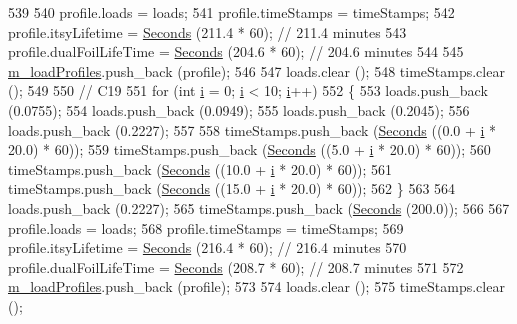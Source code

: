 \begin{DoxyCode}
539 
540   profile.loads = loads;
541   profile.timeStamps = timeStamps;
542   profile.itsyLifetime = \hyperlink{group__timecivil_ga33c34b816f8ff6628e33d5c8e9713b9e}{Seconds} (211.4 * 60);      \textcolor{comment}{// 211.4 minutes}
543   profile.dualFoilLifeTime = \hyperlink{group__timecivil_ga33c34b816f8ff6628e33d5c8e9713b9e}{Seconds} (204.6 * 60);  \textcolor{comment}{// 204.6 minutes}
544 
545   \hyperlink{classBatteryLifetimeTest_aee9ad324da18f58ee75689778580c3fb}{m\_loadProfiles}.push\_back (profile);
546 
547   loads.clear ();
548   timeStamps.clear ();
549 
550   \textcolor{comment}{// C19}
551   \textcolor{keywordflow}{for} (\textcolor{keywordtype}{int} \hyperlink{bernuolliDistribution_8m_a6f6ccfcf58b31cb6412107d9d5281426}{i} = 0; \hyperlink{bernuolliDistribution_8m_a6f6ccfcf58b31cb6412107d9d5281426}{i} < 10; \hyperlink{bernuolliDistribution_8m_a6f6ccfcf58b31cb6412107d9d5281426}{i}++)
552     \{
553       loads.push\_back (0.0755);
554       loads.push\_back (0.0949);
555       loads.push\_back (0.2045);
556       loads.push\_back (0.2227);
557 
558       timeStamps.push\_back (\hyperlink{group__timecivil_ga33c34b816f8ff6628e33d5c8e9713b9e}{Seconds} ((0.0 + \hyperlink{bernuolliDistribution_8m_a6f6ccfcf58b31cb6412107d9d5281426}{i} * 20.0) * 60));
559       timeStamps.push\_back (\hyperlink{group__timecivil_ga33c34b816f8ff6628e33d5c8e9713b9e}{Seconds} ((5.0 + \hyperlink{bernuolliDistribution_8m_a6f6ccfcf58b31cb6412107d9d5281426}{i} * 20.0) * 60));
560       timeStamps.push\_back (\hyperlink{group__timecivil_ga33c34b816f8ff6628e33d5c8e9713b9e}{Seconds} ((10.0 + \hyperlink{bernuolliDistribution_8m_a6f6ccfcf58b31cb6412107d9d5281426}{i} * 20.0) * 60));
561       timeStamps.push\_back (\hyperlink{group__timecivil_ga33c34b816f8ff6628e33d5c8e9713b9e}{Seconds} ((15.0 + \hyperlink{bernuolliDistribution_8m_a6f6ccfcf58b31cb6412107d9d5281426}{i} * 20.0) * 60));
562     \}
563 
564   loads.push\_back (0.2227);
565   timeStamps.push\_back (\hyperlink{group__timecivil_ga33c34b816f8ff6628e33d5c8e9713b9e}{Seconds} (200.0));
566 
567   profile.loads = loads;
568   profile.timeStamps = timeStamps;
569   profile.itsyLifetime = \hyperlink{group__timecivil_ga33c34b816f8ff6628e33d5c8e9713b9e}{Seconds} (216.4 * 60);      \textcolor{comment}{// 216.4 minutes}
570   profile.dualFoilLifeTime = \hyperlink{group__timecivil_ga33c34b816f8ff6628e33d5c8e9713b9e}{Seconds} (208.7 * 60);  \textcolor{comment}{// 208.7 minutes}
571 
572   \hyperlink{classBatteryLifetimeTest_aee9ad324da18f58ee75689778580c3fb}{m\_loadProfiles}.push\_back (profile);
573 
574   loads.clear ();
575   timeStamps.clear ();

\end{DoxyCode}
